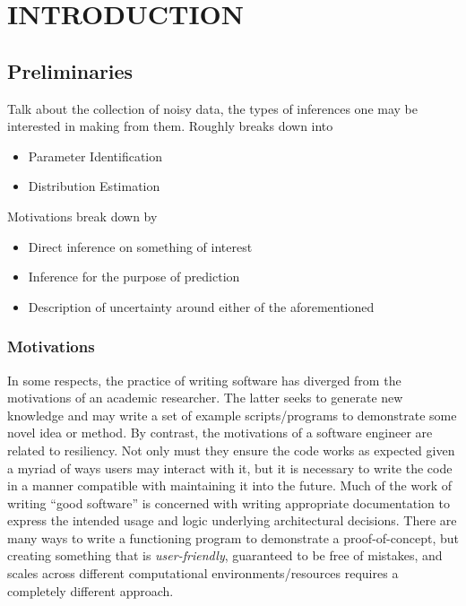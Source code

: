 \chapter{\uppercase{Introduction}} \label{chapter:01}

\section{Preliminaries}
Talk about the collection of noisy data, the types of inferences one may be interested in making from them.
Roughly breaks down into
\begin{itemize}
  \item Parameter Identification
  \item Distribution Estimation
\end{itemize}

Motivations break down by

\begin{itemize}
  \item Direct inference on something of interest
  \item Inference for the purpose of prediction
  \item Description of uncertainty around either of the aforementioned
\end{itemize}

\subsection{Motivations}\label{sec:motivations}
In some respects, the practice of writing software has diverged from the motivations of an academic researcher.
The latter seeks to generate new knowledge and may write a set of example scripts/programs to demonstrate some novel idea or method.
By contrast, the motivations of a software engineer are related to resiliency.
Not only must they ensure the code works as expected given a myriad of ways users may interact with it, but it is necessary to write the code in a manner compatible with maintaining it into the future.
Much of the work of writing ``good software'' is concerned with writing appropriate documentation to express the intended usage and logic underlying architectural decisions.
There are many ways to write a functioning program to demonstrate a proof-of-concept, but creating something that is \emph{user-friendly}, guaranteed to be free of mistakes, and scales across different computational environments/resources requires a completely different approach.

